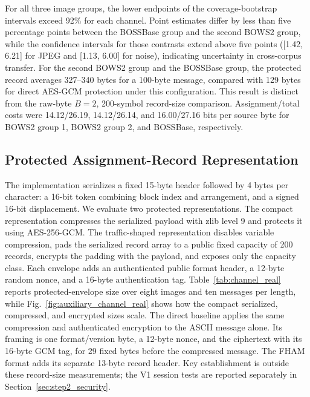 \documentclass[preprint,12pt]{elsarticle}
\theoremstyle{plain}
\begin{document}
For all three image groups, the lower endpoints of the coverage-bootstrap
intervals exceed 92\% for each channel. Point estimates differ by less than
five percentage points between the BOSSBase group and the second BOWS2 group,
while the confidence intervals for those contrasts extend above
five points ([1.42, 6.21] for JPEG and [1.13, 6.00] for noise), indicating
uncertainty in cross-corpus transfer. For the second BOWS2 group and the BOSSBase group, the protected record
averages 327--340 bytes for a 100-byte message, compared with 129 bytes for
direct AES-GCM protection under this configuration. This result is distinct
from the raw-byte $B=2$, 200-symbol record-size comparison. Assignment/total
costs were 14.12/26.19, 14.12/26.14, and 16.00/27.16 bits per source byte
for BOWS2 group 1, BOWS2 group 2, and BOSSBase, respectively.

\begin{table}[!t]
\centering
\small
\caption{Exact-message recovery for the multi-corpus profile. Intervals are 95\% cover-bootstrap intervals.}
\label{tab:multi_corpus_recovery}
\resizebox{\linewidth}{!}{}
\end{table}

\subsection{Protected Assignment-Record Representation}

The implementation serializes a fixed 15-byte header followed by 4 bytes per
character: a 16-bit token combining block index and arrangement, and a signed
16-bit displacement. We evaluate two protected representations. The compact
representation compresses the serialized payload with zlib level 9 and
protects it using AES-256-GCM. The traffic-shaped representation disables
variable compression, pads the serialized record array to a public fixed
capacity of 200 records, encrypts the padding with the payload, and exposes
only the capacity class. Each envelope adds an authenticated public format
header, a 12-byte random nonce, and a 16-byte authentication tag.
Table~\ref{tab:channel_real} reports protected-envelope size over eight
images and ten messages per length, while Fig.~\ref{fig:auxiliary_channel_real}
shows how the compact serialized, compressed, and encrypted sizes scale. The
direct baseline applies the same compression and authenticated encryption to
the ASCII message alone. Its framing is one format/version byte, a 12-byte
nonce, and the ciphertext with its 16-byte GCM tag, for 29 fixed bytes before
the compressed message. The FHAM format adds its separate 13-byte record header.
Key establishment is outside these record-size measurements; the V1 session tests are reported separately in Section~\ref{sec:step2_security}.
\end{document}

